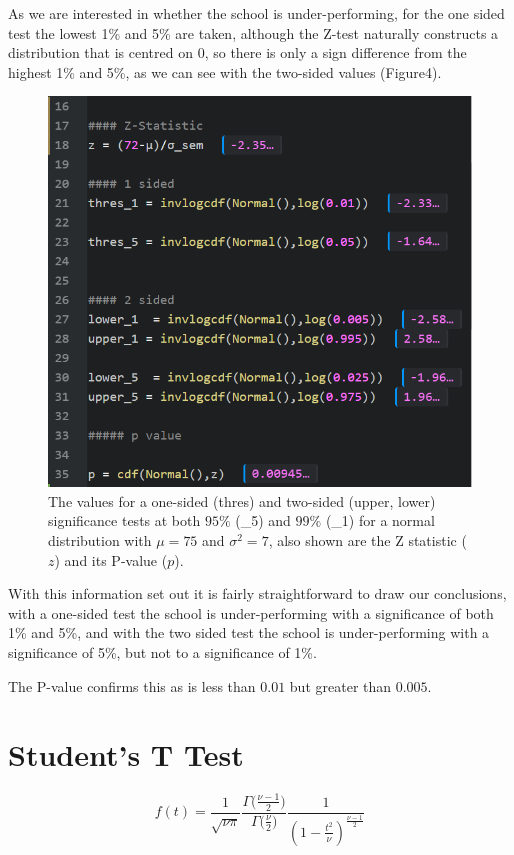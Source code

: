 \documentclass[a4paper,12pt,notitlepage]{article}
\begin{document}
As we are interested in whether the school is under-performing, for the one sided test the lowest 1\% and 5\% are taken, although the Z-test naturally constructs a distribution that is centred on $0$, so there is only a sign difference from the highest 1\% and 5\%, as we can see with the two-sided values (Figure4).
\begin{figure}[h]
\centering
\includegraphics[width=\textwidth]{Z-tests.png}
\caption{The values for a one-sided (thres) and  two-sided (upper, lower) significance tests at both $95\%$ (\_5) and $99\%$ (\_1) for a normal distribution with $\mu = 75$ and $\sigma^2 = 7$, also shown are the Z statistic ($z$) and its P-value ($p$).}
\end{figure}

With this information set out it is fairly straightforward to draw our conclusions, with a one-sided test the school is under-performing with a significance of both 1\% and 5\%, and with the two sided test the school is under-performing with a significance of 5\%, but not to a significance of 1\%.

The P-value confirms this as is less than $0.01$ but greater than $0.005$.

\section{Student's T Test}

$$f(t) = \frac{1}{\sqrt{\nu\pi}} \frac{\Gamma{\big(\frac{\nu - 1}{2}}\big)}{\Gamma{\big(\frac{\nu}{2}}\big)} \frac{1}{(1-\frac{t^2}{\nu})^{\frac{\nu-1}{2}}}$$
\end{document}
